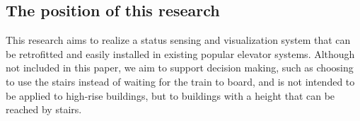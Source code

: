 \subsection{The position of this research}

This research aims to realize a status sensing and visualization system that can be retrofitted and easily installed in existing popular elevator systems. Although not included in this paper, we aim to support decision making, such as choosing to use the stairs instead of waiting for the train to board, and is not intended to be applied to high-rise buildings, but to buildings with a height that can be reached by stairs.
